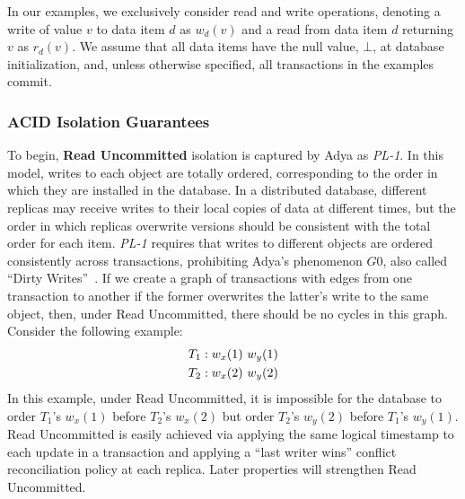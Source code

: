 In our examples, we exclusively consider read and write operations,
denoting a write of value $v$ to data item $d$ as $w_d(v)$ and a read
from data item $d$ returning $v$ as $r_d(v)$. We assume that all data
items have the null value, $\bot$, at database initialization, and,
unless otherwise specified, all transactions in the examples commit.

\subsubsection{ACID Isolation Guarantees}

To begin, \textbf{Read Uncommitted} isolation is captured by Adya as
\textit{PL-1}. In this model, writes to each object are totally
ordered, corresponding to the order in which they are installed in the
database. In a distributed database, different replicas may receive
writes to their local copies of data at different times, but the order
in which replicas overwrite versions should be consistent with the total order for
each item. \textit{PL-1} requires that writes to different objects are
ordered consistently across transactions, prohibiting Adya's
phenomenon $G0$, also called ``Dirty Writes''~\cite{adya}. If we
create a graph of transactions with edges from one transaction to
another if the former overwrites the latter's write to the same
object, then, under Read Uncommitted, there should be no cycles in
this graph. Consider the following example:
\begin{align*}
\small\vspace{-1em}
T_1 &: w_x(1)~w_y(1)
\\T_2 &: w_x(2)~w_y(2)
\end{align*}
In this example, under Read Uncommitted, it is impossible for the
database to order $T_1$'s $w_x(1)$ before $T_2$'s $w_x(2)$ but order
$T_2$'s $w_y(2)$ before $T_1$'s $w_y(1)$.  Read Uncommitted is easily
achieved via applying the same logical timestamp to each update in a
transaction and applying a ``last writer wins'' conflict
reconciliation policy at each replica. Later properties will
strengthen Read Uncommitted.

